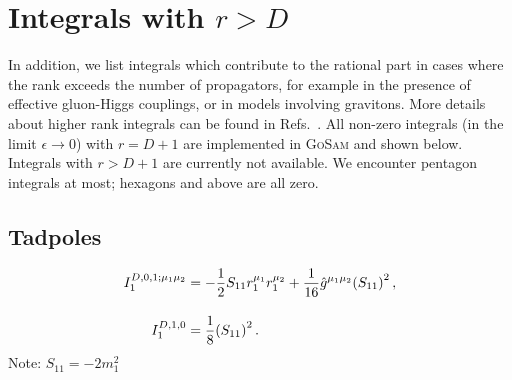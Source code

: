 \documentclass[11pt,a4paper]{refrep}
\newcommand{\gosam}{\textsc{GoSam}\xspace}
\newcommand{\diff}[1][{}]{{\mathrm{d}}^{#1}\!}
\newcommand{\bea}{\begin{eqnarray*}}
\newcommand{\eea}{\end{eqnarray*}\noindent}
\newcommand{\be}{\begin{equation}}
\newcommand{\ee}{\end{equation}}
\newcommand{\nn}{\nonumber}
\def\eps{\epsilon}
\begin{document}
\section*{Integrals with \boldmath$r>D$}
In addition, we list integrals which contribute to the rational part in cases where the rank exceeds the number of
propagators, for example in the presence of effective gluon-Higgs couplings, or in models involving
gravitons.
More details about higher rank integrals can be found in
Refs.~\cite{Guillet:2013msa,Mastrolia:2012bu,vanDeurzen:2013pja}. All non-zero integrals (in the limit $\epsilon\to0$) with $r=D+1$ are implemented in \gosam and shown below. Integrals with $r>D+1$ are currently not available. We encounter pentagon integrals at most; hexagons and above are all zero.

\subsection*{Tadpoles}
\begin{subequations}
\begin{align}
  I_1^{D,0,1;\mu_1\mu_2} &= -\frac{1}{2}S_{11}r_1^{\mu_1}r_1^{\mu_2}+\frac{1}{16}\hat{g}^{\mu_1\mu_2}\qty(S_{11})^2\,,\\[10pt]
%
  I_1^{D,1,0} &= \frac{1}{8}\qty(S_{11})^2\,.
\end{align}
\end{subequations}
Note: $S_{11}=-2m_1^2$
\end{document}

